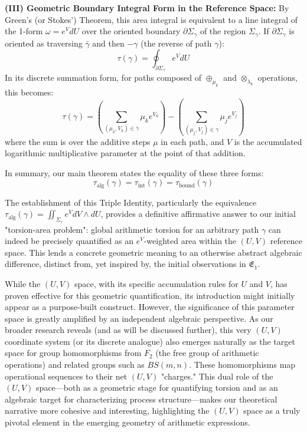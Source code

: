 \textbf{(III) Geometric Boundary Integral Form in the Reference Space:}
By Green's (or Stokes') Theorem, this area integral is equivalent to a line integral of the 1-form $\omega = e^V dU$ over the oriented boundary $\partial \Sigma_\gamma$ of the region $\Sigma_\gamma$. If $\partial \Sigma_\gamma$ is oriented as traversing $\bar{\gamma}$ and then $-\gamma$ (the reverse of path $\gamma$):
\[ \tau(\gamma) = \oint_{\partial \Sigma_\gamma} e^V dU \]
In its discrete summation form, for paths composed of $\oplus_{\mu_k}$ and $\otimes_{\lambda_k}$ operations, this becomes:
\[ \tau(\gamma) = \left(\sum_{(\mu_k, V_k) \in \bar{\gamma}} \mu_k e^{V_k}\right) - \left(\sum_{(\mu_j, V_j) \in \gamma} \mu_j e^{V_j}\right) \]
where the sum is over the additive steps $\mu$ in each path, and $V$ is the accumulated logarithmic multiplicative parameter at the point of that addition.

In summary, our main theorem states the equality of these three forms:
\begin{equation}
\tau_{\text{alg}}(\gamma) = \tau_{\text{int}}(\gamma) = \tau_{\text{bound}}(\gamma)
\label{eq:triple_identity_final_narrative_enhanced}
\end{equation}

The establishment of this Triple Identity, particularly the equivalence $\tau_{\text{alg}}(\gamma) = \iint_{\Sigma_\gamma} e^V dV \wedge dU$, provides a definitive affirmative answer to our initial "torsion-area problem": global arithmetic torsion for an arbitrary path $\gamma$ can indeed be precisely quantified as an $e^V$-weighted area within the $(U,V)$ reference space. This lends a concrete geometric meaning to an otherwise abstract algebraic difference, distinct from, yet inspired by, the initial observations in $\mathfrak{E}_1$.

While the $(U,V)$ space, with its specific accumulation rules for $U$ and $V$, has proven effective for this geometric quantification, its introduction might initially appear as a purpose-built construct. However, the significance of this parameter space is greatly amplified by an independent algebraic perspective. As our broader research reveals (and as will be discussed further), this very $(U,V)$ coordinate system (or its discrete analogue) also emerges naturally as the target space for group homomorphisms from $F_2$ (the free group of arithmetic operations) and related groups such as $BS(m,n)$. These homomorphisms map operational sequences to their net $(U,V)$ "charges." This dual role of the $(U,V)$ space—both as a geometric stage for quantifying torsion and as an algebraic target for characterizing process structure—makes our theoretical narrative more cohesive and interesting, highlighting the $(U,V)$ space as a truly pivotal element in the emerging geometry of arithmetic expressions.

